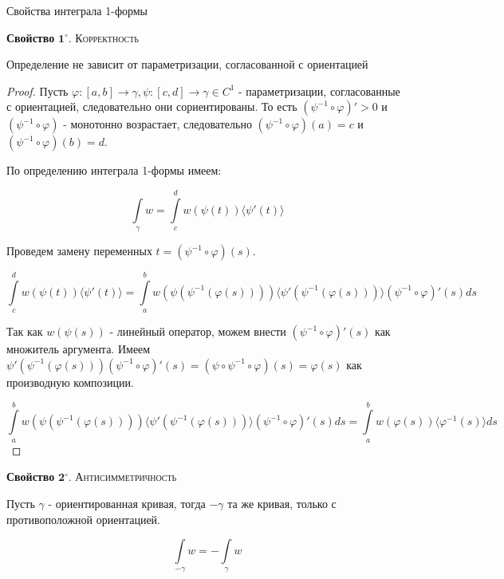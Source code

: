 \documentclass[a5paper]{article}
\theoremstyle{plain}
\theoremstyle{definition}
\numberwithin{through}{section}
\numberwithin{equation}{section}
\begin{document}
Свойства интеграла 1-формы


	{\bf Свойство} $\mathbf{1^\circ.}$
	{\textsc{Корректность}}
	
	Определение не зависит от параметризации, согласованной с ориентацией
	
	\begin{proof}
		Пусть $\varphi : [a, b] \to \gamma, \psi : [c, d] \to \gamma \in C^1$ - параметризации, согласованные с ориентацией, следовательно они сориентированы. То есть  $(\psi^{-1} \circ \varphi)' > 0$ и $(\psi^{-1} \circ \varphi)$ - монотонно возрастает, следовательно $(\psi^{-1} \circ \varphi)(a) = c$ и $(\psi^{-1} \circ \varphi)(b) = d$.
		
		По определению интеграла 1-формы имеем:
		
		\begin{equation*}
			\int\limits_{\gamma} w = \int\limits_{c}^{d} w(\psi(t)) \langle \psi'(t) \rangle 
		\end{equation*}
		
		Проведем замену переменных $t = (\psi^{-1} \circ \varphi)(s)$.
		
		\begin{equation*}
			\int\limits_{c}^{d} w(\psi(t)) \langle \psi'(t) \rangle = \int\limits_{a}^{b} w(\psi(\psi^{-1}(\varphi(s)))) \langle \psi'(\psi^{-1}(\varphi(s))) \rangle (\psi^{-1} \circ \varphi)'(s) ds
		\end{equation*}
		
		Так как $w(\psi(s))$ - линейный оператор, можем внести $(\psi^{-1} \circ \varphi)'(s)$ как множитель аргумента. Имеем $\psi'(\psi^{-1}(\varphi(s)))(\psi^{-1} \circ \varphi)'(s) = (\psi \circ \psi^{-1} \circ \varphi)(s)= \varphi(s)$ как производную композиции.
		
		\begin{equation*}
			 \int\limits_{a}^{b} w(\psi(\psi^{-1}(\varphi(s)))) \langle \psi'(\psi^{-1}(\varphi(s))) \rangle (\psi^{-1} \circ \varphi)'(s) ds = \int\limits_{a}^{b} w(\varphi(s)) \langle \varphi^{-1}(s) \rangle ds
		\end{equation*} 
	\end{proof}

	{\bf Свойство} $\mathbf{2^\circ.}$
	{\textsc{Антисимметричность}}
	
	Пусть $\gamma$ - ориентированная кривая, тогда $-\gamma$ та же кривая, только с противоположной ориентацией. 
	
	\begin{equation*}
		\int\limits_{-\gamma} w = -\int\limits_{\gamma} w
	\end{equation*}
	
\end{document}
